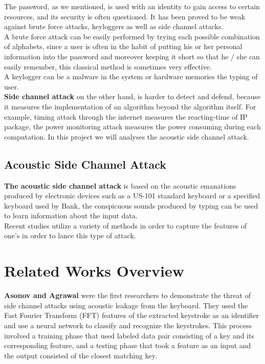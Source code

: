 \documentclass[12pt,a4paper]{article}
\begin{document}
The password, as we mentioned, is used with an identity to gain access to certain resources, and its security is often questioned. It has been proved to be weak against brute force attacks, keyloggers as well as side channel attacks. \\

A brute force attack can be easily performed by trying each possible combination of alphabets, since a user is often in the habit of putting his or her personal information into the password and moreover keeping it short so that he / she can easily remember, this classical method is sometimes very effective. \\

A keylogger can be a malware in the system or hardware memories the typing of user.\\

\textbf{Side channel attack} on the other hand, is harder to detect and defend, because it measures the implementation of an algorithm beyond the algorithm itself. For example, timing attack through the internet measures the reacting-time of IP package, the power monitoring attack measures the power consuming during each computation. In this project we will analyses the acoustic side channel attack. \\


\subsection{Acoustic Side Channel Attack}

\textbf{The acoustic side channel attack} is based on the acoustic emanations produced by electronic devices such as a US-101 standard keyboard or a specified keyboard used by Bank, the conspicuous sounds produced by typing can be used to learn information about the input data. \\

Recent studies utilize a variety of methods in order to capture the features of one's in order to lance this type of attack.\\



\newpage

\section{Related Works Overview}


\textbf{Asonov and Agrawal\cite{DBLP:conf/sp/AsonovA04}} were the first researchers to demonstrate the threat of side channel attacks using acoustic leakage from the keyboard. They used the Fast Fourier Transform (FFT) features of the extracted keystroke as an identifier and use a neural network to classify and recognize the keystrokes. This process involved a training phase that used labeled data pair consisting of a key and its corresponding feature, and a testing phase that took a feature as an input and the output consisted of the closest matching key.\\
\end{document}
